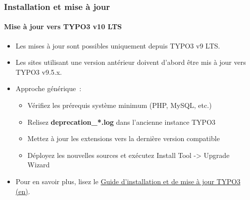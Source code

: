 \begin{frame}[fragile]
	\frametitle{Installation et mise à jour}
	\framesubtitle{Mise à jour vers TYPO3 v10 LTS}

	\begin{itemize}
		\item Les mises à jour sont possibles uniquement depuis TYPO3 v9 LTS\@.
		\item Les sites utilisant une version antérieur doivent d'abord être mis à jour vers TYPO3 v9.5.x.
	\end{itemize}

	\begin{itemize}
		\item Approche générique~:
			\begin{itemize}
				\item Vérifiez les prérequis système minimum \small(PHP, MySQL, etc.)
				\item Relisez \textbf{deprecation\_*.log} dans l'ancienne instance TYPO3
				\item Mettez à jour les extensions vers la dernière version compatible
				\item Déployez les nouvelles sources et exécutez Install Tool -> Upgrade Wizard
			\end{itemize}
		\item Pour en savoir plus, lisez le
			\href{https://docs.typo3.org/m/typo3/guide-installation/master/en-us/Upgrade/Index.html}{Guide d'installation et de mise à jour TYPO3 (en)}.

	\end{itemize}

\end{frame}

